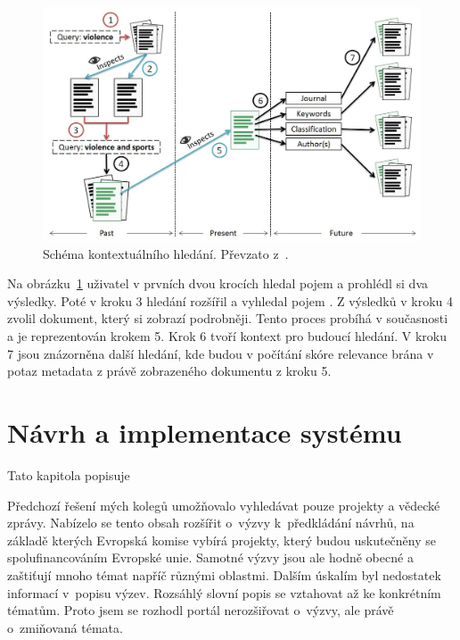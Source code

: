 \begin{figure}[H]
	\centering
	\includegraphics[width=\textwidth]{obrazky-figures/contextual.png}
	\caption{Schéma kontextuálního hledání. Převzato z~\cite{bib:similarity-context}.}
	\label{img:contextual}
\end{figure}

Na obrázku~\ref{img:contextual} uživatel v prvních dvou krocích hledal pojem  a prohlédl si dva výsledky. Poté v kroku 3 hledání rozšířil a vyhledal pojem . Z výsledků v kroku 4 zvolil dokument, který si zobrazí podrobněji. Tento proces probíhá v současnosti a je reprezentován krokem 5. Krok 6 tvoří kontext pro budoucí hledání. V kroku 7 jsou znázorněna další hledání, kde budou v počítání skóre relevance brána v potaz metadata z právě zobrazeného dokumentu z kroku 5.





\chapter{Návrh a implementace systému}
Tato kapitola popisuje \blindtext

Předchozí řešení mých kolegů umožňovalo vyhledávat pouze projekty a vědecké zprávy. Nabízelo se tento obsah rozšířit o~výzvy k~předkládání návrhů, na základě kterých Evropská komise vybírá projekty, který budou uskutečněny se spolufinancováním Evropské unie.
Samotné výzvy jsou ale hodně obecné a zaštiťují mnoho témat napříč různými oblastmi. Dalším úskalím byl nedostatek informací v~popisu výzev. Rozsáhlý slovní popis se vztahovat až ke konkrétním tématům. Proto jsem se rozhodl portál nerozšiřovat o~výzvy, ale právě o~zmiňovaná témata.

